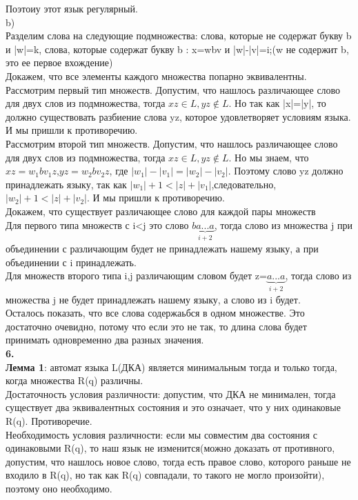 \documentclass[a4paper,12pt]{article}
\begin{document}
Поэтоиу этот язык регулярный.\\
b)\\
Разделим слова на следующие подмножества: слова, которые не содержат букву b и |w|=k, слова, которые содержат букву b : x=wbv и |w|-|v|=i;(w не содержит b, это ее первое вхождение)\\
Докажем, что все элементы каждого множества попарно эквивалентны.\\
Рассмотрим первый тип множеств. Допустим, что нашлось различающее слово для двух слов из подмножества, тогда $xz \in L, yz \notin L$. Но так как |x|=|y|, то должно существовать разбиение слова yz, которое удовлетворяет условиям языка. И мы пришли к противоречию.\\
Рассмотрим второй тип множеств. Допустим, что нашлось различающее слово для двух слов из подмножества, тогда $xz \in L, yz \notin L$. Но мы знаем, что $xz=w_1bv_1z$,$yz=w_2bv_2z$, где $|w_1|-|v_1|=|w_2|-|v_2|$. Поэтому слово yz должно принадлежать языку, так как $|w_1|+1<|z|+|v_1|$,следовательно,$|w_2|+1<|z|+|v_2|$. И мы пришли к противоречию.\\
Докажем, что существует различающее слово для каждой пары множеств\\
Для первого типа множеств с i<j это слово $b\underbrace{a...a}_{i+2}$, тогда слово из множества j при объединении с различающим будет не принадлежать нашему языку, а при объединении с i принадлежать.\\
Для множеств второго типа i,j различающим словом будет z=$\underbrace{a...a}_{i+2}$, тогда слово из множества j не будет принадлежать нашему языку, а слово из i будет.\\
Осталось показать, что все слова содержаьбся в одном множестве. Это достаточно очевидно, потому что если это не так, то длина слова будет принимать одновременно два разных значения.\\
\textbf{6.}\\
\textbf{Лемма 1}: автомат языка L(ДКА) является минимальным тогда и только тогда, когда множества R(q) различны.\\
Достаточность условия различности: допустим, что ДКА не минимален, тогда существует два эквивалентных состояния и это означает, что у них одинаковые R(q). Противоречие.\\
Необходимость условия различности: если мы совместим два состояния с одинаковыми R(q), то наш язык не изменится(можно доказать от противного, допустим, что нашлось новое слово, тогда есть правое слово, которого раньше не входило в R(q), но так как R(q) совпадали, то такого не могло произойти), поэтому оно необходимо.\\
\end{document}
